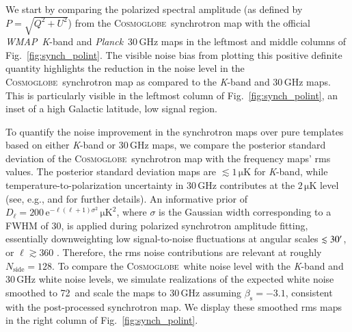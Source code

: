 \documentclass[twocolumn]{../../common/aa}
\def\WMAP{\emph{WMAP}}
\def\Planck{\emph{Planck}}
\newcommand{\cosmoglobe}{\textsc{Cosmoglobe}}
\newcommand{\K}[0]{\textit K}
\newcommand{\e}{\mathrm e}
\begin{document}
We start by comparing the polarized spectral amplitude (as defined by $P=\sqrt{Q^2+U^2}$) from the \cosmoglobe\ synchrotron map with the official \WMAP\ \K-band and \Planck\ 30\,GHz maps in the leftmost and middle columns of Fig.~\ref{fig:synch_polint}. The visible noise bias from plotting this positive definite quantity highlights the reduction in the noise level in the \cosmoglobe\ synchrotron map as compared to the \K-band and 30\,GHz maps. This is particularly visible in the leftmost column of Fig.~\ref{fig:synch_polint}, an inset of a high Galactic latitude, low signal region.


To quantify the noise improvement in the synchrotron maps over pure templates based on either \K-band or 30\,GHz maps, we compare the posterior standard deviation of the \cosmoglobe\ synchrotron map with the frequency maps' rms values. The posterior standard deviation maps are $\lesssim1\,\mathrm{\mu K}$ for \K-band, while temperature-to-polarization uncertainty in 30\,GHz contributes at the $2\,\mathrm{\mu K}$ level (see, e.g., \citealp{watts2023_dr1} and \citealp{bp10} for further details). An informative prior of $D_\ell=200\,\e^{-\ell(\ell+1)\sigma^2}\,\mathrm{\mu K^2}$, where $\sigma$ is the Gaussian width corresponding to a FWHM of 30\arcm, is applied during polarized synchrotron amplitude fitting, essentially downweighting low signal-to-noise fluctuations at angular scales $\lesssim30\arcm$, or $\ell\gtrsim360$ \citep{bp14}. Therefore, the rms noise contributions are relevant at roughly $N_\mathrm{side}=128$. To compare the \cosmoglobe\ white noise level with the \K-band and 30\,GHz white noise levels, we simulate realizations of the expected white noise smoothed to 72\arcm\ and scale the maps to 30\,GHz assuming $\beta_\mathrm s=-3.1$, consistent with the post-processed synchrotron map. We display these smoothed rms maps in the right column of Fig.~\ref{fig:synch_polint}.
\end{document}
